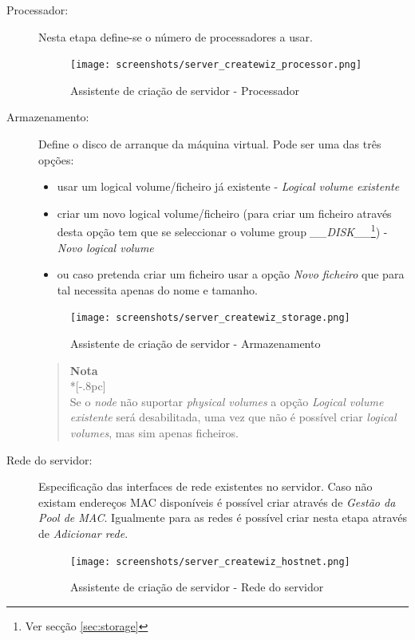 \begin{description}
	\item[Processador:] Nesta etapa define-se o número de processadores a usar.
		\begin{figure}[H]
        		\begin{center}
		        \texttt{[image: screenshots/server\_createwiz\_processor.png]}
        		\caption{Assistente de criação de servidor - Processador}
		        \label{fig:server_createwiz_processor}
	        	\end{center}
		\end{figure}

	\item[Armazenamento:] Define o disco de arranque da máquina virtual. Pode ser uma das três opções:
\begin{itemize}
	\item usar um logical volume/ficheiro já existente - \emph{Logical volume existente}
	\item criar um novo logical volume/ficheiro (para criar um ficheiro através desta opção tem que se seleccionar o volume group \emph{\_\_DISK\_\_}\footnote{Ver secção \ref{sec:storage}}) - \emph{Novo logical volume}
	\item  ou caso pretenda criar um ficheiro usar a opção \emph{Novo ficheiro} que para tal necessita apenas do nome e tamanho.
\end{itemize}

        \begin{figure}[H]
        		\begin{center}
	        	\texttt{[image: screenshots/server\_createwiz\_storage.png]}
	        	\caption{Assistente de criação de servidor - Armazenamento}
		        \label{fig:server_createwiz_storage}
        		\end{center}
		\end{figure}

		\begin{quote}
			{\large \bf Nota} \\*[-.8pc]
			\underline{\hspace{6in}} \\
			Se o \emph{node} não suportar \emph{physical volumes} a opção \emph{Logical volume existente} será desabilitada, uma vez que não é possível criar \emph{logical volumes}, mas sim apenas ficheiros.
		\end{quote}		
        
        
        \item[Rede do servidor:] Especificação das interfaces de rede existentes no servidor. Caso não existam endereços MAC disponíveis é possível criar através de \emph{Gestão da Pool de MAC}. Igualmente para as redes é possível criar nesta etapa através de \emph{Adicionar rede}.
		\begin{figure}[H]
        		\begin{center}
	        	\texttt{[image: screenshots/server\_createwiz\_hostnet.png]}
	        	\caption{Assistente de criação de servidor - Rede do servidor}
		        \label{fig:server_createwiz_hostnet}
        		\end{center}
		\end{figure}


\end{description}
